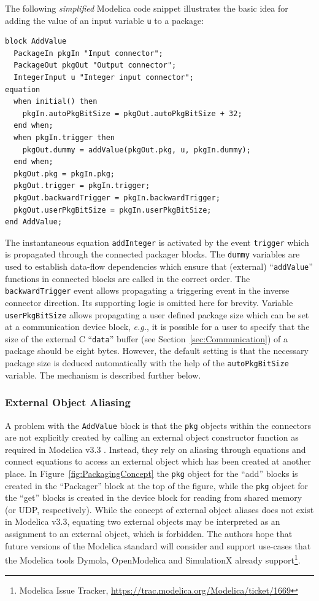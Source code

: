 \documentclass{resources/modelica}
\newcommand{\modelica}[1]{\lstinline[language=modelica]|#1|}
\begin{document}
The
following \emph{simplified} Modelica code snippet illustrates the basic idea for
adding the value of an input variable \modelica{u} to a package:
\begin{lstlisting}[language=modelica]
block AddValue
  PackageIn pkgIn "Input connector";
  PackageOut pkgOut "Output connector";
  IntegerInput u "Integer input connector";
equation
  when initial() then
    pkgIn.autoPkgBitSize = pkgOut.autoPkgBitSize + 32;
  end when;
  when pkgIn.trigger then
    pkgOut.dummy = addValue(pkgOut.pkg, u, pkgIn.dummy);
  end when;
  pkgOut.pkg = pkgIn.pkg;
  pkgOut.trigger = pkgIn.trigger;
  pkgOut.backwardTrigger = pkgIn.backwardTrigger;
  pkgOut.userPkgBitSize = pkgIn.userPkgBitSize;
end AddValue;
\end{lstlisting}
The instantaneous equation \modelica{addInteger} is activated by the event
\modelica{trigger} which is propagated through the connected packager blocks.
The \modelica{dummy} variables are used to establish data-flow dependencies
which ensure that (external) ``\modelica{addValue}'' functions in connected
blocks are called in the correct order. The \modelica{backwardTrigger} event
allows propagating a triggering event in the inverse connector direction.
Its supporting logic is omitted here for brevity. Variable
\modelica{userPkgBitSize} allows propagating a user defined package size which
can be set at a communication device block, \textit{e.g.}, it is possible for a
user to specify that the size of the external C ``\modelica{data}'' buffer (see
Section~\ref{sec:Communication}) of a package should be eight bytes. However,
the default setting is that the necessary package size is deduced automatically
with the help of the \modelica{autoPkgBitSize} variable. The mechanism is
described further below.

\subsubsection{External Object Aliasing}
\label{sec:External Object Aliasing}

A problem with the \modelica{AddValue} block is that the \modelica{pkg}
objects within the connectors are not explicitly created by calling an external object constructor
function as required in Modelica v3.3 \cite[p.\@~165]{ModelicaAssociation2014}.
Instead, they rely on aliasing through equations and connect equations to
access an external object which has been created at another place. In
Figure~\ref{fig:PackagingConcept} the \modelica{pkg} object for the ``add''
blocks is created in the ``Packager'' block at the top of the figure, while the
\modelica{pkg} object for the ``get'' blocks is created in the device block for reading from
shared memory (or UDP, respectively). While the concept of external object
aliases does not exist in Modelica v3.3, equating two external
objects may be interpreted as an assignment to an external object,
which is forbidden. The authors hope that future versions of
the Modelica standard will consider and support use-cases that the
Modelica tools Dymola, OpenModelica and SimulationX already support\footnote{Modelica Issue Tracker,
\url{https://trac.modelica.org/Modelica/ticket/1669}}.
\end{document}
